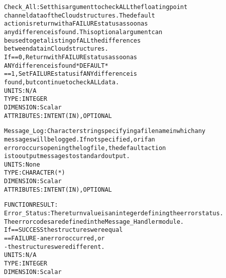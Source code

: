 \begin{alltt}
        Check_All:         Set this argument to check ALL the floating point
                           channel data of the Cloud structures. The default
                           action is return with a FAILURE status as soon as
                           any difference is found. This optional argument can
                           be used to get a listing of ALL the differences
                           between data in Cloud structures.
                           If == 0, Return with FAILURE status as soon as
                                    ANY difference is found  *DEFAULT*
                              == 1, Set FAILURE status if ANY difference is
                                    found, but continue to check ALL data.
                           UNITS:      N/A
                           TYPE:       INTEGER
                           DIMENSION:  Scalar
                           ATTRIBUTES: INTENT(IN), OPTIONAL
 
        Message_Log:       Character string specifying a filename in which any
                           messages will be logged. If not specified, or if an
                           error occurs opening the log file, the default action
                           is to output messages to standard output.
                           UNITS:      None
                           TYPE:       CHARACTER(*)
                           DIMENSION:  Scalar
                           ATTRIBUTES: INTENT(IN), OPTIONAL
 
  FUNCTION RESULT:
        Error_Status:      The return value is an integer defining the error status.
                           The error codes are defined in the Message_Handler module.
                           If == SUCCESS the structures were equal
                              == FAILURE - an error occurred, or
                                         - the structures were different.
                           UNITS:      N/A
                           TYPE:       INTEGER
                           DIMENSION:  Scalar
 
  \end{alltt}
